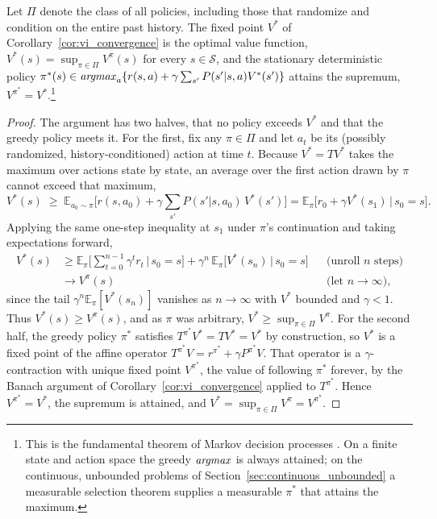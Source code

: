 \begin{theorem}
\label{thm:verification}
Let $\Pi$ denote the class of all policies, including those that randomize and condition on the entire past history. The fixed point $V^*$ of Corollary~\ref{cor:vi_convergence} is the optimal value function, $V^*(s) = \sup_{\pi \in \Pi} V^\pi(s)$ for every $s \in \mathcal{S}$, and the stationary deterministic policy $\pi^*(s) \in \mathop{\it argmax}_{a} \{ r(s,a) + \gamma \sum_{s'} P(s'|s,a) V^*(s') \}$ attains the supremum, $V^{\pi^*} = V^*$.\footnote{This is the fundamental theorem of Markov decision processes \citep[Ch.~6]{puterman1994}. On a finite state and action space the greedy $\mathop{\it argmax}$ is always attained; on the continuous, unbounded problems of Section~\ref{sec:continuous_unbounded} a measurable selection theorem supplies a measurable $\pi^*$ that attains the maximum.}
\end{theorem}

\begin{proof}
The argument has two halves, that no policy exceeds $V^*$ and that the greedy policy meets it. For the first, fix any $\pi \in \Pi$ and let $a_t$ be its (possibly randomized, history-conditioned) action at time $t$. Because $V^* = TV^*$ takes the maximum over actions state by state, an average over the first action drawn by $\pi$ cannot exceed that maximum,
\[
V^*(s) \;\geq\; \mathbb{E}_{a_0 \sim \pi}\Big[ r(s,a_0) + \gamma \sum_{s'} P(s'|s,a_0)\, V^*(s') \Big] = \mathbb{E}_\pi\big[ r_0 + \gamma V^*(s_1) \,\big|\, s_0 = s \big].
\]
Applying the same one-step inequality at $s_1$ under $\pi$'s continuation and taking expectations forward,
\begin{align*}
V^*(s)
  &\geq \mathbb{E}_\pi\Big[ \textstyle\sum_{t=0}^{n-1} \gamma^t r_t \,\Big|\, s_0 = s \Big] + \gamma^n\, \mathbb{E}_\pi\big[ V^*(s_n) \,\big|\, s_0 = s \big]
    && \text{(unroll $n$ steps)} \\
  &\longrightarrow V^\pi(s)
    && \text{(let $n \to \infty$),}
\end{align*}
since the tail $\gamma^n \mathbb{E}_\pi[V^*(s_n)]$ vanishes as $n \to \infty$ with $V^*$ bounded and $\gamma < 1$. Thus $V^*(s) \geq V^\pi(s)$, and as $\pi$ was arbitrary, $V^* \geq \sup_{\pi \in \Pi} V^\pi$. For the second half, the greedy policy $\pi^*$ satisfies $T^{\pi^*} V^* = TV^* = V^*$ by construction, so $V^*$ is a fixed point of the affine operator $T^{\pi^*} V = r^{\pi^*} + \gamma P^{\pi^*} V$. That operator is a $\gamma$-contraction with unique fixed point $V^{\pi^*}$, the value of following $\pi^*$ forever, by the Banach argument of Corollary~\ref{cor:vi_convergence} applied to $T^{\pi^*}$. Hence $V^{\pi^*} = V^*$, the supremum is attained, and $V^* = \sup_{\pi \in \Pi} V^\pi = V^{\pi^*}$.
\end{proof}

